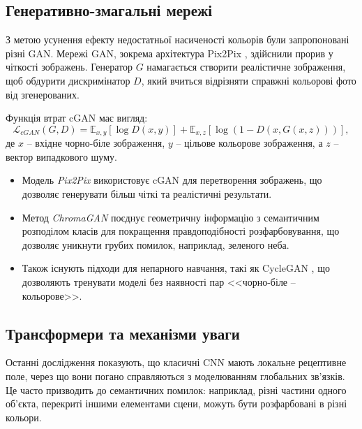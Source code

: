         \subsection{Генеративно-змагальні мережі}
            З метою усунення ефекту недостатньої насиченості кольорів були запропоновані різні GAN.
            Мережі GAN, зокрема архітектура Pix2Pix \cite{2017-image-to-image-translation}, здійснили прорив у чіткості зображень.
            Генератор $G$ намагається створити реалістичне зображення, щоб обдурити дискримінатор $D$, який вчиться відрізняти справжні кольорові фото від згенерованих.
            
            Функція втрат cGAN має вигляд:
            \begin{equation*}
                \mathcal{L}_{cGAN}(G, D) = \mathbb{E}_{x, y}[\log D(x, y)] + \mathbb{E}_{x, z}[\log(1 - D(x, G(x, z)))],
            \end{equation*}
            де $x$ -- вхідне чорно-біле зображення, $y$ -- цільове кольорове зображення, а $z$ -- вектор випадкового шуму.
            
            \begin{itemize}[label=$\bullet$] 
                \item Модель \textit{Pix2Pix} \cite{2017-image-to-image-translation} використовує cGAN для перетворення зображень, що дозволяє генерувати більш чіткі та реалістичні результати.
                \item Метод \textit{ChromaGAN} \cite{2020-chromagan} поєднує геометричну інформацію з семантичним розподілом класів для покращення правдоподібності розфарбовування, що дозволяє уникнути грубих помилок, наприклад, зеленого неба.
                \item Також існують підходи для непарного навчання, такі як CycleGAN \cite{2017-unpaired-image-to-image-translation}, що дозволяють тренувати моделі без наявності пар <<чорно-біле -- кольорове>>.
            \end{itemize}

        \subsection{Трансформери та механізми уваги}
            Останні дослідження \cite{2021-colorization-transformer, 2022-unicolor, 2023-ddcolor} показують, що класичні CNN мають локальне рецептивне поле, через що вони погано справляються з моделюванням глобальних зв'язків.
            Це часто призводить до семантичних помилок: наприклад, різні частини одного об'єкта, перекриті іншими елементами сцени, можуть бути розфарбовані в різні кольори.
            
